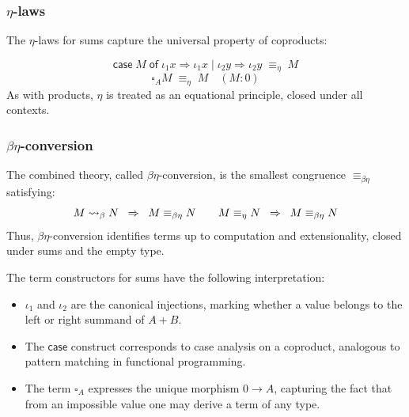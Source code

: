 \subsubsection{\centering $\eta$-laws}
The $\eta$-laws for sums capture the universal property of coproducts:

\[
  \mathsf{case}\;M\;\mathsf{of}\;\iota_1 x \Rightarrow \iota_1 x \mid \iota_2 y \Rightarrow \iota_2 y \;\equiv_\eta\; M
\]
\[
  \square_A M \;\equiv_\eta\; M \quad (M:0)
\]
As with products, $\eta$ is treated as an equational principle, closed under all contexts.
\subsubsection{\centering $\beta\eta$-conversion}
The combined theory, called $\beta\eta$-conversion, is the smallest congruence $\equiv_{\beta\eta}$ satisfying:
\[
  M \mathrel{\leadsto}_\beta N \;\;\Rightarrow\;\; M \equiv_{\beta\eta} N
  \qquad
  M \equiv_\eta N \;\;\Rightarrow\;\; M \equiv_{\beta\eta} N
\]
Thus, $\beta\eta$-conversion identifies terms up to computation and extensionality, closed under sums and the empty type.
\begin{remark}
  The term constructors for sums have the following interpretation:
  \begin{itemize}
  \item $\iota_1$ and $\iota_2$ are the canonical injections, marking whether a value belongs to the left or right summand of $A + B$.
  \item The $\mathsf{case}$ construct corresponds to case analysis on a coproduct, analogous to pattern matching in functional programming.
  \item The term $\mathsf{\square}_A$ expresses the unique morphism $0 \to A$, capturing the fact that from an impossible value one may derive a term of any type.
  \end{itemize}
\end{remark}
